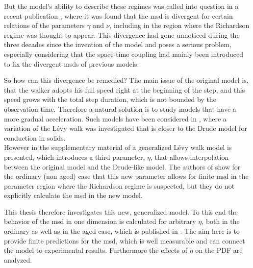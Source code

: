 But the model's ability to describe these regimes was called into question in a recent publication 
\cite{radons2018}
, where it was found that the \gls*{msd} is divergent for certain relations of the parameters $\gamma$ and $\nu$, including in the region where the Richardson regime was thought to appear. This divergence had gone unnoticed during the three decades since the invention of the model and poses a serious problem, especially considering that the space-time coupling had mainly been introduced to fix the divergent \gls*{msd}s of previous models. 

So how can this divergence be remedied? The main issue of the original model is, that the walker adopts his full speed right at the beginning of the step, and this speed grows with the total step duration, which is not bounded by the observation time. Therefore a natural solution is to study models that have a more gradual acceleration. Such models have been considered in 
\cite{BarkaiKlafterBuch,schulz1997}
, where a variation of the L\'evy walk was investigated that is closer to the Drude model for conduction in solids.\\
However in the supplementary material of 
\cite{radons2018} 
a generalized L\'evy walk model is presented, which introduces a third parameter, $\eta$, that allows interpolation between the original model and the Drude-like model. The authors of 
 \cite{radons2018} 
show for the ordinary (non aged) case that this new parameter allows for finite \gls*{msd} in the parameter region where the Richardson regime is suspected, but they do not explicitly calculate the \gls*{msd} in the new model.
 
This thesis therefore investigates this new, generalized model. To this end the behavior of the \gls*{msd} in one dimension is calculated for arbitrary $\eta$, both in the ordinary as well as in the aged case, which is published in 
\cite{bothe}
. The aim here is to provide finite predictions for the \gls*{msd}, which is well measurable and can connect the model to experimental results. Furthermore the effects of $\eta$ on the \gls*{PDF} are analyzed.


